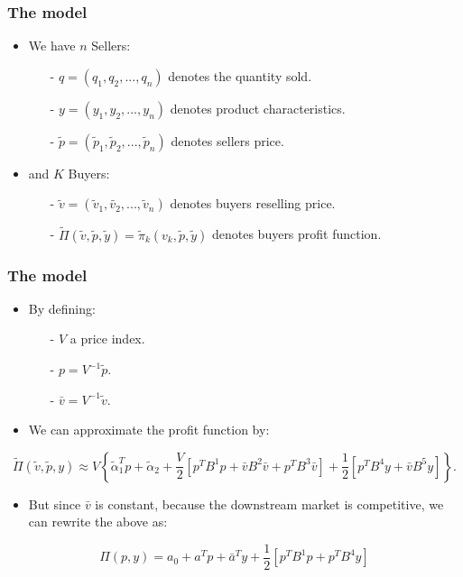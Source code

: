 \documentclass{beamer}
\begin{document}
\begin{frame}
  \frametitle{The model}
  \begin{itemize}
    \item We have $n$ Sellers:
      \begin{itemize}
        \item[-] $q = (q_1, q_2, ..., q_n)$ denotes the quantity sold.
        \item[-] $y = (y_1, y_2, ..., y_n)$ denotes product characteristics.
        \item[-] $\tilde{p}= (\tilde{p}_1, \tilde{p}_2, ..., \tilde{p}_n)$ denotes sellers price.
      \end{itemize}
    \item and $K$ Buyers:
      \begin{itemize}
        \item[-] $\tilde{v} = (\tilde{v}_1, \tilde{v_2}, ..., \tilde{v}_n)$ denotes buyers reselling price.
        \item[-] $\tilde{\Pi}(\tilde{v}, \tilde{p}, \tilde{y}) = \tilde{\pi}_k(v_k, \tilde{p}, \tilde{y})$ denotes buyers profit function.
      \end{itemize}
  \end{itemize}
\end{frame}

\begin{frame}
  \frametitle{The model}
  \begin{itemize}
    \item By defining:
      \begin{itemize}
        \item[-] $V$ a price index.
        \item[-] $p = V^{-1}\tilde{p}$.
        \item[-] $\bar{v} = V^{-1}\tilde{v}$.
      \end{itemize}
    \item We can approximate the profit function by:
  \end{itemize}
  \vspace{2mm}
  \footnotesize\[ \tilde{\Pi}(\tilde{v}, \tilde{p}, y) \approx V \left\{ \tilde{\alpha}^T_1p + \tilde{\alpha}_2 + \frac{V}{2}\left[p^TB^1p + \bar{v}B^2\bar{v} + p^TB^3\bar{v}\right] + \frac{1}{2}\left[p^TB^4y + \bar{v}B^5y\right]\right\}.  \]

  \begin{itemize}
    \item But since $\bar{v}$ is constant, because the downstream market is competitive, we can rewrite the above as:
  \end{itemize}

  \footnotesize\[ \Pi(p, y) = a_0 + a^Tp + \bar{a}^Ty + \frac{1}{2}\left[p^TB^1p + p^TB^4y\right] \]

\end{frame}
\end{document}

